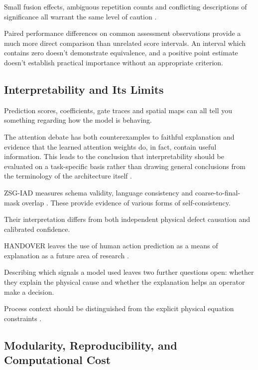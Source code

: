 Small fusion effects, ambiguous repetition counts and conflicting descriptions of significance all
warrant the same level of caution \parencite{gu_improved_2024,xu_modality-resilient_2025}.

Paired performance differences on common assessment observations provide a much more direct
comparison than unrelated score intervals. An interval which contains zero doesn't demonstrate
equivalence, and a positive point estimate doesn't establish practical importance without an
appropriate criterion.

\subsection{Interpretability and Its Limits}

Prediction scores, coefficients, gate traces and spatial maps can all tell you something regarding
how the model is behaving.

The attention debate has both counterexamples to faithful explanation and evidence that the learned
attention weights do, in fact, contain useful information. This leads to the conclusion that
interpretability should be evaluated on a task-specific basis rather than drawing general
conclusions from the terminology of the architecture itself \parencite{wiegreffe_attention_2019}.

ZSG-IAD measures schema validity, language consistency and coarse-to-final-mask overlap
\parencite{chen_zsg-iad_2026}. These provide evidence of various forms of self-consistency.

Their interpretation differs from both independent physical defect causation and calibrated
confidence.

HANDOVER leaves the use of human action prediction as a means of explanation as a future area of
research \parencite{thoduka_multimodal_2024}.

Describing which signals a model used leaves two further questions open: whether they explain the physical cause and whether the explanation helps an operator make a decision.

Process context should be distinguished from the explicit physical equation constraints \parencite[e.g.,
PGMTKD's pressure model;][]{li_pgmtkd_2025}.

\subsection{Modularity, Reproducibility, and Computational Cost}

